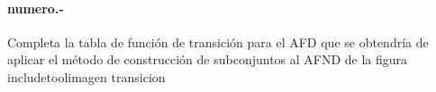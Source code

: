 

\paragraph{{numero}.-}\label{p{numero}}
Completa la tabla de función de transición para el AFD que se obtendría de aplicar el método de construcción de subconjuntos al AFND de la figura
    {includetool}{{imagen}}
{transicion}
